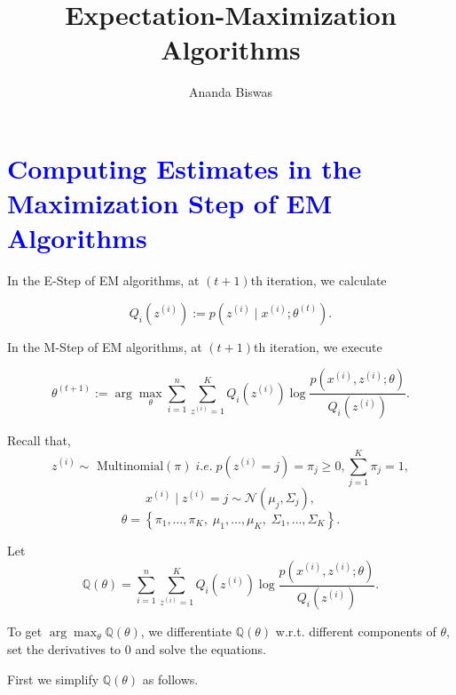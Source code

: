 \documentclass[11pt, a4paper]{article}
\title{Expectation-Maximization Algorithms}
\author{{\fontsize{25}{20} \benyorithafont Ananda Biswas}}
\date{}
\begin{document}
\maketitle

\section*{\faArrowAltCircleRight[regular] \textcolor{blue}{Computing Estimates in the Maximization Step of EM Algorithms}}

In the E-Step of EM algorithms, at $(t+1)$th iteration, we calculate

\begin{equation}
Q_i(z^{(i)}) := p(z^{(i)} \mid x^{(i)}; \theta^{(t)}).
\end{equation}

\noindent In the M-Step of EM algorithms, at $(t+1)$th iteration, we execute

\begin{equation}
\theta^{(t+1)} := \arg \max_{\theta} \sum \limits_{i = 1}^{n} \sum \limits_{z^{(i)} = 1}^{K} Q_i(z^{(i)}) \log \dfrac{ p\left(x^{(i)}, z^{(i)}; \theta\right) }{ Q_i(z^{(i)}) }.
\end{equation}

Recall that, $$z^{(i)} \sim \text{ Multinomial}(\pi) \; i.e. \; p\left(z^{(i)} = j\right) = \pi_j \geq 0, \sum \limits_{j = 1}^{K} \pi_j = 1,$$
$$x^{(i)} \mid z^{(i)} = j \sim \mathcal{N}(\mu_j, \Sigma_j),$$
$$\theta = \left\{ \pi_1, \ldots, \pi_K,\; \mu_1, \ldots, \mu_K,\; \Sigma_1, \ldots, \Sigma_K \right\}.$$

Let $$\mathbb{Q}(\theta) = \sum \limits_{i = 1}^{n} \sum \limits_{z^{(i)} = 1}^{K} Q_i(z^{(i)}) \log \dfrac{ p\left(x^{(i)}, z^{(i)}; \theta\right) }{ Q_i(z^{(i)}) }.$$

To get $\arg \max_{\theta} \mathbb{Q}(\theta)$, we differentiate $\mathbb{Q}(\theta)$ w.r.t. different components of $\theta$, set the derivatives to $0$ and solve the equations.

First we simplify $\mathbb{Q}(\theta)$ as follows.
\end{document}
